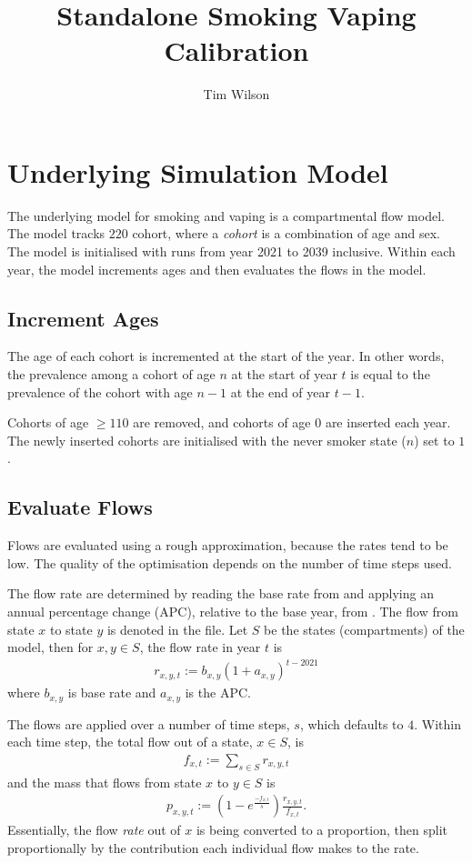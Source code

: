 \documentclass[]{article}
\title{Standalone Smoking Vaping Calibration}
\author{Tim Wilson}
\begin{document}
	
	\maketitle
	
	\section{Underlying Simulation Model}
	
	The underlying model for smoking and vaping is a compartmental flow model. The model tracks $220$ cohort, where a \emph{cohort} is a combination of age and sex. The model is initialised with  runs from year 2021 to 2039 inclusive. Within each year, the model increments ages and then evaluates the flows in the model.
	
	\subsection{Increment Ages}
	The age of each cohort is incremented at the start of the year. In other words, the prevalence among a cohort of age $n$ at the start of year $t$ is equal to the prevalence of the cohort with age $n-1$ at the end of year $t-1$.
	
	Cohorts of age $\geq 110$ are removed, and cohorts of age $0$ are inserted each year. The newly inserted cohorts are initialised with the never smoker state ($n$) set to $1$.
	
	\subsection{Evaluate Flows}
	
	Flows are evaluated using a rough approximation, because the rates tend to be low. The quality of the optimisation depends on the number of time steps used.
	
	The flow rate are determined by reading the base rate from  and applying an annual percentage change (APC), relative to the base year, from . The flow from state $x$ to state $y$ is denoted  in the file. Let $S$ be the states (compartments) of the model, then for $x,y \in S$, the flow rate in year $t$ is
	\begin{align*}
		r_{x, y, t} := b_{x,y} (1 + a_{x,y})^{t - 2021}
	\end{align*}
	where $b_{x, y}$ is base rate and $a_{x,y}$ is the APC.
	
	The flows are applied over a number of time steps, $s$, which defaults to $4$. Within each time step, the total flow out of a state, $x \in S$, is
	\begin{align*}
		f_{x, t} := \sum_{s \in S} r_{x, y, t}
	\end{align*}
	and the mass that flows from state $x$ to $y \in S$ is
	\begin{align*}
		p_{x, y, t} :=\left(1 - e^\frac{-f_{x, t}}{s}\right) \frac{r_{x, y, t}}{f_{x, t}}.
	\end{align*}
	Essentially, the flow \emph{rate} out of $x$ is being converted to a proportion, then split proportionally by the contribution each individual flow makes to the rate.
	
\end{document}
